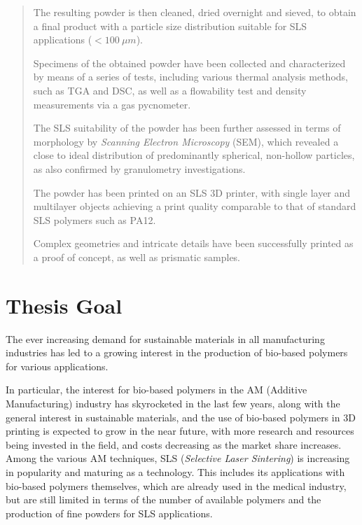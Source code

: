 \documentclass{article}
\begin{document}
\begin{abstract}
        The resulting powder is then cleaned, dried overnight and sieved, to obtain a final product with a particle size distribution suitable for SLS applications ($ < 100 \ \mu m $).


        Specimens of the obtained powder have been collected and characterized by means of a series of tests, including various thermal analysis methods, such as TGA and DSC, as well as a flowability test and density measurements via a gas pycnometer.

        The SLS suitability of the powder has been further assessed in terms of morphology by \textit{Scanning Electron Microscopy} (SEM), which revealed a close to ideal distribution of predominantly spherical, non-hollow particles, 
        as also confirmed by granulometry investigations. 

        The powder has been printed on an SLS 3D printer, with single layer and multilayer objects achieving a print quality comparable to that of standard SLS polymers such as PA12.

        Complex geometries and intricate details have been successfully printed as a proof of concept, as well as prismatic samples. 
                     


    \end{abstract}
    \newpage
    \tableofcontents
    \newpage 
    \listoffigures
    \listoftables
    \newpage


    \newpage

    \section{Thesis Goal\label{Thesis_Goal}}

    The ever increasing demand for sustainable materials in all manufacturing industries has led to a growing interest in the 
    production of bio-based polymers for various applications. 

    In particular, the interest for bio-based polymers in the AM (Additive Manufacturing) industry has skyrocketed in the last few years, 
    along with the general interest in sustainable materials, and the use of bio-based polymers in 3D printing is expected to grow in the near future, 
    with more research and resources being invested in the field, and costs decreasing as the market share increases. \\  

    Among the various AM techniques, SLS (\textit{Selective Laser Sintering}) is increasing in popularity and 
    maturing as a technology. This includes its applications with bio-based polymers themselves, which are already used in the medical industry, 
    but are still limited in terms of the number of available polymers and the production of fine powders for SLS applications. \\ 
\end{document}
